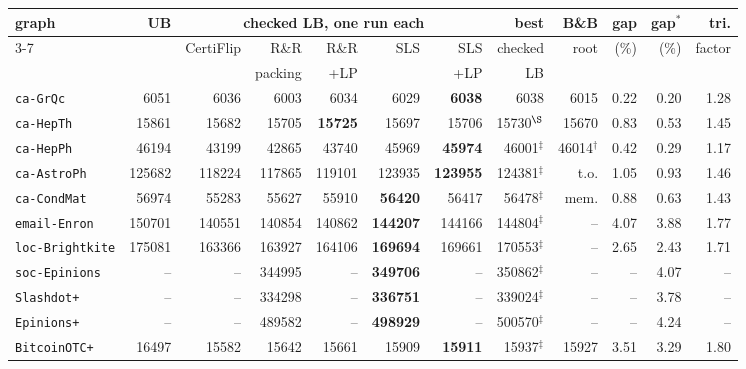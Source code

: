 \begin{tabular}{lrrrrrrrrrrr}
\toprule
graph & UB & \multicolumn{5}{c}{checked LB, one run each} & best & B\&B & gap & gap$^*$ & tri.\\
\cmidrule(lr){3-7}
 & & CertiFlip & R\&R & R\&R & SLS & SLS & checked & root & (\%) & (\%) & factor \\
 & & & packing & +LP & & +LP & LB & & & & \\
\midrule
\texttt{ca-GrQc} & \num{6051} & \num{6036} & \num{6003} & \num{6034} & \num{6029} & \textbf{\num{6038}} & \num{6038} & \num{6015} & 0.22 & 0.20 & 1.28 \\
\texttt{ca-HepTh} & \num{15861} & \num{15682} & \num{15705} & \textbf{\num{15725}} & \num{15697} & \num{15706} & \num{15730}$^\S$ & \num{15670} & 0.83 & 0.53 & 1.45 \\
\texttt{ca-HepPh} & \num{46194} & \num{43199} & \num{42865} & \num{43740} & \num{45969} & \textbf{\num{45974}} & \num{46001}$^\ddagger$ & \num{46014}$^\dagger$ & 0.42 & 0.29 & 1.17 \\
\texttt{ca-AstroPh} & \num{125682} & \num{118224} & \num{117865} & \num{119101} & \num{123935} & \textbf{\num{123955}} & \num{124381}$^\ddagger$ & t.o. & 1.05 & 0.93 & 1.46 \\
\texttt{ca-CondMat} & \num{56974} & \num{55283} & \num{55627} & \num{55910} & \textbf{\num{56420}} & \num{56417} & \num{56478}$^\ddagger$ & mem. & 0.88 & 0.63 & 1.43 \\
\texttt{email-Enron} & \num{150701} & \num{140551} & \num{140854} & \num{140862} & \textbf{\num{144207}} & \num{144166} & \num{144804}$^\ddagger$ & -- & 4.07 & 3.88 & 1.77 \\
\texttt{loc-Brightkite} & \num{175081} & \num{163366} & \num{163927} & \num{164106} & \textbf{\num{169694}} & \num{169661} & \num{170553}$^\ddagger$ & -- & 2.65 & 2.43 & 1.71 \\
\texttt{soc-Epinions} & -- & -- & \num{344995} & -- & \textbf{\num{349706}} & -- & \num{350862}$^\ddagger$ & -- & -- & 4.07 & -- \\
\texttt{Slashdot+} & -- & -- & \num{334298} & -- & \textbf{\num{336751}} & -- & \num{339024}$^\ddagger$ & -- & -- & 3.78 & -- \\
\texttt{Epinions+} & -- & -- & \num{489582} & -- & \textbf{\num{498929}} & -- & \num{500570}$^\ddagger$ & -- & -- & 4.24 & -- \\
\texttt{BitcoinOTC+} & \num{16497} & \num{15582} & \num{15642} & \num{15661} & \num{15909} & \textbf{\num{15911}} & \num{15937}$^\ddagger$ & \num{15927} & 3.51 & 3.29 & 1.80 \\

\end{tabular}
